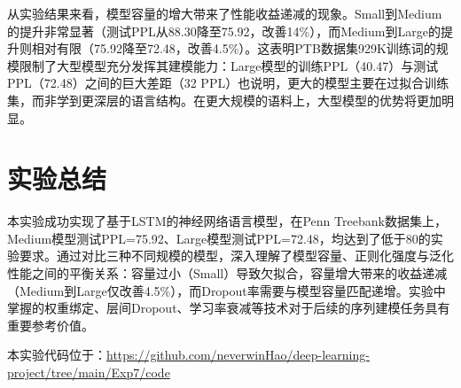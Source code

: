 \documentclass[12pt,a4paper]{article}
\begin{document}
从实验结果来看，模型容量的增大带来了性能收益递减的现象。Small到Medium的提升非常显著（测试PPL从88.30降至75.92，改善14\%），而Medium到Large的提升则相对有限（75.92降至72.48，改善4.5\%）。这表明PTB数据集929K训练词的规模限制了大型模型充分发挥其建模能力：Large模型的训练PPL（40.47）与测试PPL（72.48）之间的巨大差距（32 PPL）也说明，更大的模型主要在过拟合训练集，而非学到更深层的语言结构。在更大规模的语料上，大型模型的优势将更加明显。

\section{实验总结}

本实验成功实现了基于LSTM的神经网络语言模型，在Penn Treebank数据集上，Medium模型测试PPL=75.92、Large模型测试PPL=72.48，均达到了低于80的实验要求。通过对比三种不同规模的模型，深入理解了模型容量、正则化强度与泛化性能之间的平衡关系：容量过小（Small）导致欠拟合，容量增大带来的收益递减（Medium到Large仅改善4.5\%），而Dropout率需要与模型容量匹配递增。实验中掌握的权重绑定、层间Dropout、学习率衰减等技术对于后续的序列建模任务具有重要参考价值。

本实验代码位于：\url{https://github.com/neverwinHao/deep-learning-project/tree/main/Exp7/code}
\end{document}
